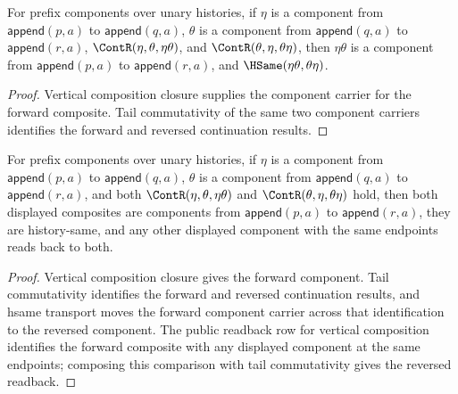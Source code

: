 \begin{theorem}
\label{thm:nattrans-prefix-component-vert-comp-tail-comm-closed}
For prefix components over unary histories, if \(\eta\) is a component from
\(\mathsf{append}(p,a)\) to \(\mathsf{append}(q,a)\), \(\theta\) is a component
from \(\mathsf{append}(q,a)\) to \(\mathsf{append}(r,a)\),
\(\ContR(\eta,\theta,\eta\theta)\), and
\(\ContR(\theta,\eta,\theta\eta)\), then \(\eta\theta\) is a component from
\(\mathsf{append}(p,a)\) to \(\mathsf{append}(r,a)\), and
\(\HSame(\eta\theta,\theta\eta)\).
\end{theorem}
\begin{proof}
Vertical composition closure supplies the component carrier for the forward
composite. Tail commutativity of the same two component carriers identifies
the forward and reversed continuation results.
\end{proof}

\begin{theorem}
\label{thm:nattrans-prefix-component-vert-comp-tail-comm-public-readback}
For prefix components over unary histories, if \(\eta\) is a component from
\(\mathsf{append}(p,a)\) to \(\mathsf{append}(q,a)\), \(\theta\) is a component
from \(\mathsf{append}(q,a)\) to \(\mathsf{append}(r,a)\), and both
\(\ContR(\eta,\theta,\eta\theta)\) and \(\ContR(\theta,\eta,\theta\eta)\)
hold, then both displayed composites are components from
\(\mathsf{append}(p,a)\) to \(\mathsf{append}(r,a)\), they are history-same,
and any other displayed component with the same endpoints reads back to both.
\end{theorem}
\begin{proof}
Vertical composition closure gives the forward component. Tail commutativity
identifies the forward and reversed continuation results, and hsame transport
moves the forward component carrier across that identification to the reversed
component. The public readback row for vertical composition identifies the
forward composite with any displayed component at the same endpoints; composing
this comparison with tail commutativity gives the reversed readback.
\end{proof}
